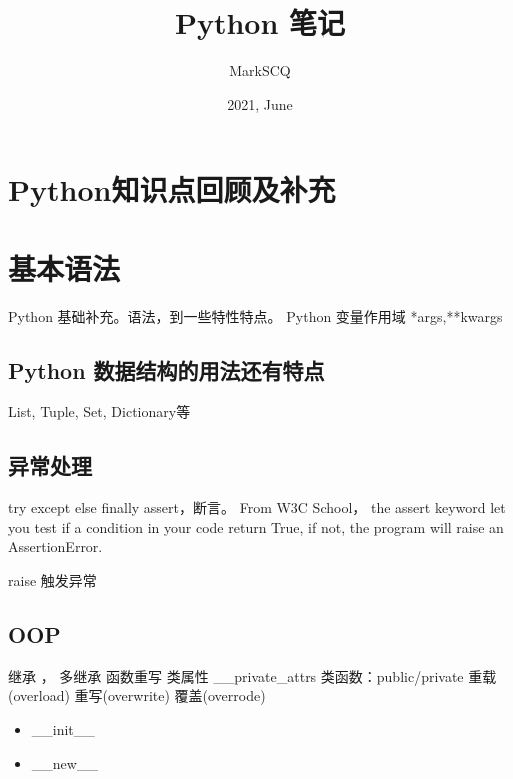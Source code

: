 \documentclass[UTF8]{article}
\title{Python 笔记}
\author{MarkSCQ}
\date{2021, June}
\begin{document}
\maketitle
  
\tableofcontents

\newpage

\section{Python知识点回顾及补充}
\section{基本语法}
Python 基础补充。语法，到一些特性特点。\newline
Python 变量作用域
*args,**kwargs

\subsection{Python 数据结构的用法还有特点}
List, Tuple, Set, Dictionary等

\subsection{异常处理}

try except else finally \newline
assert，断言。 From W3C School， the assert keyword let you test if a condition in your code return  True, if not, the program will raise an AssertionError.\newline

raise 触发异常

\subsection{OOP}

继承 ， 多继承 \newline
函数重写 \newline
类属性  \_\_private\_attrs \newline
类函数：public/private \newline
重载(overload)\newline
重写(overwrite)\newline
覆盖(overrode)\newline

\begin{itemize}
    \item \_\_init\_\_
    \item \_\_new\_\_
\end{itemize}
\end{document}
